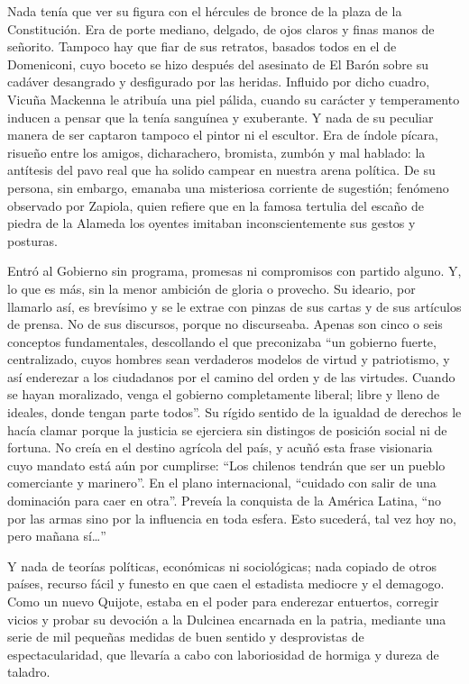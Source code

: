 \documentclass[10pt,twoside,openright]{memoir}
\begin{document}
Nada tenía que ver su figura con el hércules de bronce de la plaza de la
Constitución. Era de porte mediano, delgado, de ojos claros y finas
manos de señorito. Tampoco hay que
fiar de sus retratos, basados todos en el de Domeniconi, cuyo boceto se
hizo después del asesinato de El Barón sobre su cadáver desangrado y
desfigurado por las heridas. Influido por dicho cuadro, Vicuña Mackenna
le atribuía una piel pálida, cuando su carácter y temperamento inducen a
pensar que la tenía sanguínea y exuberante. Y nada de su peculiar manera
de ser captaron tampoco el pintor ni el escultor. Era de índole pícara,
risueño entre los amigos, dicharachero, bromista, zumbón y mal hablado:
la antítesis del pavo real que ha solido campear en nuestra arena
política. De su persona, sin embargo, emanaba una misteriosa corriente
de sugestión; fenómeno observado por Zapiola, quien refiere que en la
famosa tertulia del escaño de piedra de la Alameda los oyentes imitaban
inconscientemente sus gestos y
posturas.

Entró al Gobierno sin programa, promesas ni compromisos con partido
alguno. Y, lo que es más, sin la menor ambición de gloria o provecho. Su
ideario, por llamarlo así, es
brevísimo y se le extrae con pinzas de sus cartas y de sus artículos de
prensa. No de sus discursos, porque
no discurseaba. Apenas son cinco o seis conceptos fundamentales,
descollando el que preconizaba ``un gobierno fuerte, centralizado, cuyos
hombres sean verdaderos modelos de virtud y
patriotismo, y así enderezar a los
ciudadanos por el camino del orden y de las virtudes. Cuando se hayan
moralizado, venga el gobierno completamente liberal; libre y lleno de
ideales, donde tengan parte todos''. Su rígido sentido de la igualdad de
derechos le hacía clamar porque la justicia se ejerciera sin distingos
de posición social ni de fortuna. No creía en el destino
agrícola del país, y acuñó esta frase visionaria cuyo mandato está aún por cumplirse: ``Los chilenos tendrán que ser un pueblo comerciante y marinero''. 
En el plano internacional, ``cuidado con
salir de una dominación para caer en otra''. Preveía la conquista de la
América Latina, ``no por las armas sino por la influencia en toda
esfera. Esto sucederá, tal vez hoy no, pero mañana sí\ldots''

Y nada de teorías políticas, económicas ni sociológicas; nada copiado de
otros países, recurso fácil y funesto en que caen el estadista mediocre
y el demagogo. Como un nuevo Quijote, estaba en el poder para enderezar
entuertos, corregir vicios y probar su devoción a la Dulcinea encarnada
en la patria, mediante una serie de mil pequeñas medidas de buen sentido
y desprovistas de espectacularidad, que llevaría a cabo con laboriosidad
de hormiga y dureza de taladro.
\end{document}
